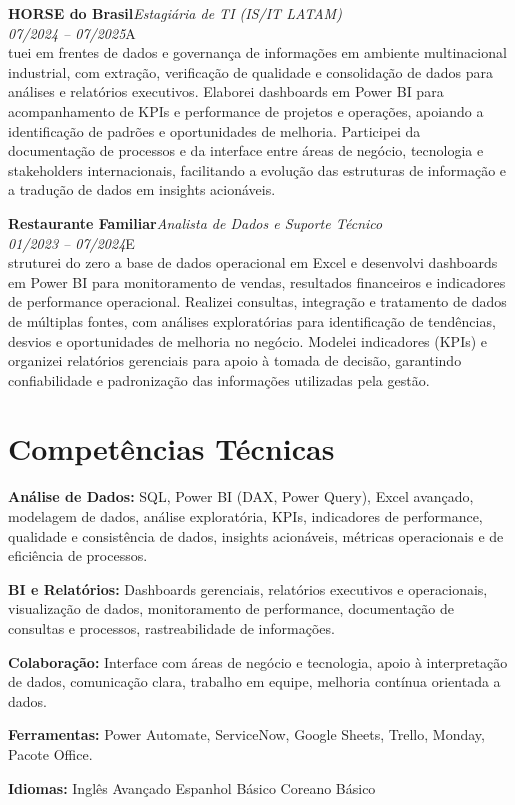 \documentclass[11pt,a4paper]{article}
\newcommand{\cvrole}[4]{%
  \vspace{4pt}%
  {\bfseries\color{accentcolor}#1}\hfill{\itshape #2}\\[-2pt]%
  {\itshape #3}\hfill #4\\[6pt]%
}
\begin{document}
\cvrole{HORSE do Brasil}{Estagiária de TI (IS/IT LATAM)}{07/2024 -- 07/2025}

Atuei em frentes de dados e governança de informações em ambiente multinacional industrial, com extração, verificação de qualidade e consolidação de dados para análises e relatórios executivos. Elaborei dashboards em Power BI para acompanhamento de KPIs e performance de projetos e operações, apoiando a identificação de padrões e oportunidades de melhoria. Participei da documentação de processos e da interface entre áreas de negócio, tecnologia e stakeholders internacionais, facilitando a evolução das estruturas de informação e a tradução de dados em insights acionáveis.

\cvrole{Restaurante Familiar}{Analista de Dados e Suporte Técnico}{01/2023 -- 07/2024}

Estruturei do zero a base de dados operacional em Excel e desenvolvi dashboards em Power BI para monitoramento de vendas, resultados financeiros e indicadores de performance operacional. Realizei consultas, integração e tratamento de dados de múltiplas fontes, com análises exploratórias para identificação de tendências, desvios e oportunidades de melhoria no negócio. Modelei indicadores (KPIs) e organizei relatórios gerenciais para apoio à tomada de decisão, garantindo confiabilidade e padronização das informações utilizadas pela gestão.

\section{Competências Técnicas}

\textbf{Análise de Dados:} SQL, Power BI (DAX, Power Query), Excel avançado, modelagem de dados, análise exploratória, KPIs, indicadores de performance, qualidade e consistência de dados, insights acionáveis, métricas operacionais e de eficiência de processos.

\textbf{BI e Relatórios:} Dashboards gerenciais, relatórios executivos e operacionais, visualização de dados, monitoramento de performance, documentação de consultas e processos, rastreabilidade de informações.

\textbf{Colaboração:} Interface com áreas de negócio e tecnologia, apoio à interpretação de dados, comunicação clara, trabalho em equipe, melhoria contínua orientada a dados.

\textbf{Ferramentas:} Power Automate, ServiceNow, Google Sheets, Trello, Monday, Pacote Office.

\textbf{Idiomas:} Inglês Avançado \enspace\textbullet\enspace Espanhol Básico \enspace\textbullet\enspace Coreano Básico
\end{document}
